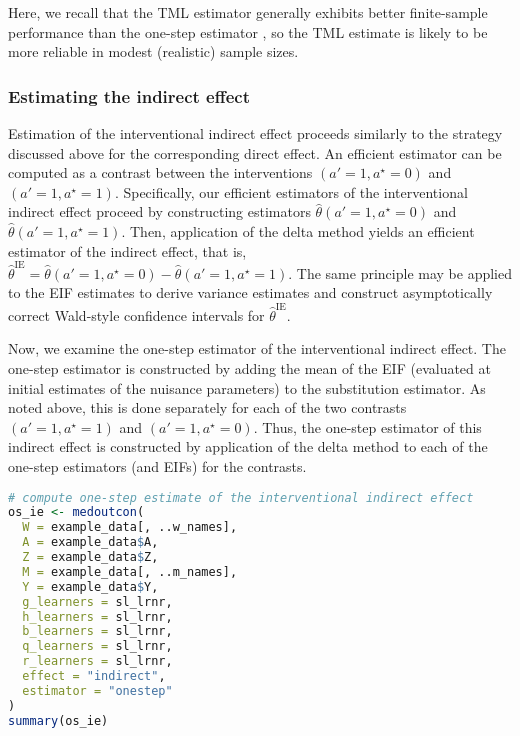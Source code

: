 \documentclass[
  12pt,
]{book}
\theoremstyle{definition}
\theoremstyle{definition}
\theoremstyle{definition}
\newcommand{\1}{\mathbbm{1}}
\begin{document}
Here, we recall that the TML
estimator generally exhibits better finite-sample performance than the one-step
estimator \citep{vdl2011targeted, vdl2018targeted}, so the TML estimate is likely to
be more reliable in modest (realistic) sample sizes.

\hypertarget{estimating-the-indirect-effect}{%
\subsubsection{Estimating the indirect effect}\label{estimating-the-indirect-effect}}

Estimation of the interventional indirect effect proceeds similarly to the
strategy discussed above for the corresponding direct effect. An efficient
estimator can be computed as a contrast between the interventions \((a' = 1, a^{\star} = 0)\) and \((a' = 1, a^{\star} = 1)\). Specifically, our efficient
estimators of the interventional indirect effect proceed by constructing
estimators \(\hat{\theta}(a' = 1, a^{\star} = 0)\) and \(\hat{\theta}(a' = 1, a^{\star} = 1)\). Then, application of the delta method yields an efficient
estimator of the indirect effect, that is, \(\hat{\theta}^{\text{IE}} = \hat{\theta}(a' = 1, a^{\star} = 0) - \hat{\theta}(a' = 1, a^{\star} = 1)\). The
same principle may be applied to the EIF estimates to derive variance estimates
and construct asymptotically correct Wald-style confidence intervals for
\(\hat{\theta}^{\text{IE}}\).

Now, we examine the one-step estimator of the interventional indirect effect.
The one-step estimator is constructed by adding the mean of the EIF
(evaluated at initial estimates of the nuisance parameters) to the substitution
estimator. As noted above, this is done separately for each of the two contrasts
\((a' = 1, a^{\star} = 1)\) and \((a' = 1, a^{\star} = 0)\). Thus, the one-step
estimator of this indirect effect is constructed by application of the delta
method to each of the one-step estimators (and EIFs) for the contrasts.

\begin{lstlisting}[language=R]
# compute one-step estimate of the interventional indirect effect
os_ie <- medoutcon(
  W = example_data[, ..w_names],
  A = example_data$A,
  Z = example_data$Z,
  M = example_data[, ..m_names],
  Y = example_data$Y,
  g_learners = sl_lrnr,
  h_learners = sl_lrnr,
  b_learners = sl_lrnr,
  q_learners = sl_lrnr,
  r_learners = sl_lrnr,
  effect = "indirect",
  estimator = "onestep"
)
summary(os_ie)
\end{lstlisting}
\end{document}
